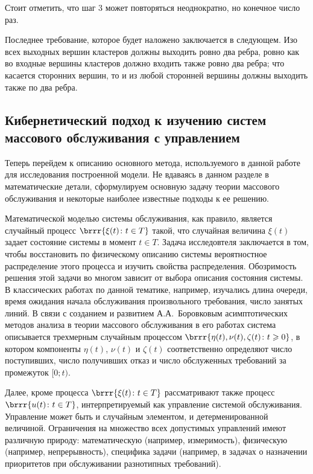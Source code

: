 Стоит отметить, что шаг $3$ может повторяться неоднократно, но конечное число раз.
 
Последнее требование, которое будет наложено заключается в следующем. Изо всех выходных вершин кластеров должны выходить ровно два ребра, ровно как во входные вершины кластеров должно входить также ровно два ребра; что касается сторонних вершин, то и из любой сторонней вершины должны выходить также по два ребра.
















\subsection{Кибернетический подход к изучению систем массового обслуживания с управлением}
Теперь перейдем к описанию основного метода, используемого в данной работе для исследования построенной модели. Не вдаваясь в данном разделе в математические детали, сформулируем основную задачу теории массового обслуживания и некоторые наиболее известные подходы к ее решению. 

Математической моделью системы обслуживания, как правило, является случайный процесс $\brrr{\xi(t) \colon t \in T}$ такой, что случайная величина $\xi(t)$ задает состояние системы в момент $t \in T$. Задача исследовтеля заключается в том, чтобы восстановить по физическому описанию системы вероятностное распределение этого процесса и изучить свойства распределения. Обозримость решения этой задачи во многом зависит от выбора описания состояния системы. В классических работах по данной тематике, например, изучались длина очереди, время ожидания начала обслуживания произвольного требования, число занятых линий. В связи с созданием и развитием А.А.~Боровковым асимптотических методов анализа в теории массового обслуживания в его работах система описывается трехмерным случайным процессом $\brrr{\eta(t), \nu(t), \zeta(t)\colon t \geqslant 0}$, в котором компоненты $\eta(t)$, $\nu(t)$ и $\zeta(t)$ соответственно определяют число поступивших, число получивших отказ и число обслуженных требований за промежуток $[0;t)$. 

Далее, кроме процесса $\brrr{\xi(t) \colon t \in T}$ рассматривают также процесс $\brrr{u(t) \colon t \in T}$, интерпретируемый как управление системой обслуживания. Управление может быть и случайным элементом, и детерменированной величиной. Ограничения на множество всех допустимых управлений имеют различную природу: математическую (например, измеримость), физическую (например, непрерывность), специфика задачи (например, в задачах о назначении приоритетов при обслуживании разнотипных требований).

